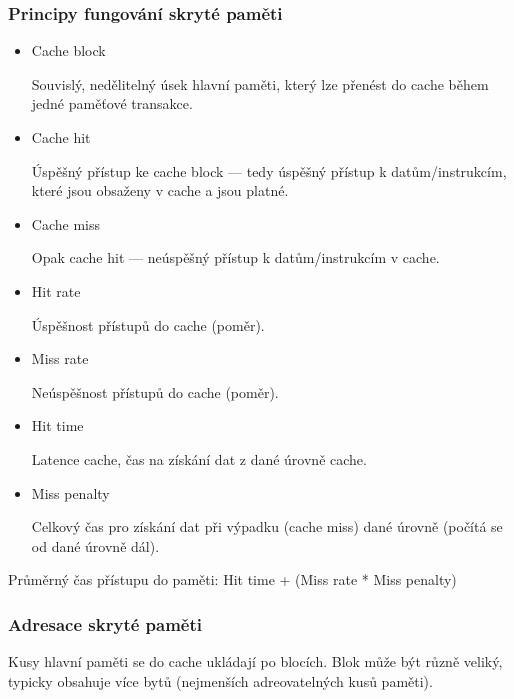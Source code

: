 \subsubsection*{Principy fungování skryté paměti}
\begin{itemize}
	\item Cache block
	
	Souvislý, nedělitelný úsek hlavní paměti, který lze přenést do cache během jedné paměťové transakce.
	
	\item Cache hit
	
	Úspěšný přístup ke cache block --- tedy úspěšný přístup k datům/instrukcím, které jsou obsaženy v cache a jsou platné.
	
	\item Cache miss
	
	Opak cache hit --- neúspěšný přístup k datům/instrukcím v cache.
	
	\item Hit rate
	
	Úspěšnost přístupů do cache (poměr). 
	
	\item Miss rate
	
	Neúspěšnost přístupů do cache (poměr).
	
	\item Hit time
	
	Latence cache, čas na získání dat z dané úrovně cache.
	
	\item Miss penalty
	
	Celkový čas pro získání dat při výpadku (cache miss) dané úrovně (počítá se od dané úrovně dál).
\end{itemize}

Průměrný čas přístupu do paměti: Hit time + (Miss rate * Miss penalty)

\subsubsection*{Adresace skryté paměti}
Kusy hlavní paměti se do cache ukládají po blocích. Blok může být různě veliký, typicky obsahuje více bytů (nejmenších adreovatelných kusů paměti).


